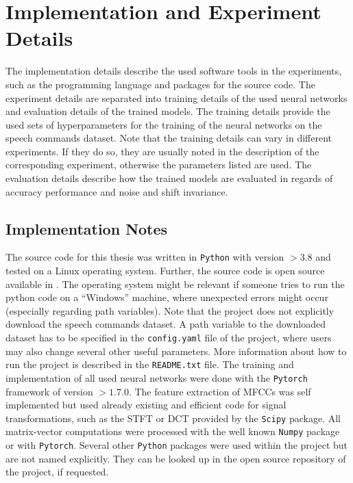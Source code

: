 
\section{Implementation and Experiment Details}\label{sec:exp_details}
The implementation details describe the used software tools in the experiments, such as the programming language and packages for the source code.
The experiment details are separated into training details of the used neural networks and evaluation details of the trained models.
The training details provide the used sets of hyperparameters for the training of the neural networks on the speech commands dataset.
Note that the training details can vary in different experiments.
If they do so, they are usually noted in the description of the corresponding experiment, otherwise the parameters listed are used.
The evaluation details describe how the trained models are evaluated in regards of accuracy performance and noise and shift invariance.



\subsection{Implementation Notes}\label{sec:exp_details_implementation}
The source code for this thesis was written in \texttt{Python} with version $>3.8$ and tested on a Linux operating system.
Further, the source code is open source available in \cite{KWSGame}.
The operating system might be relevant if someone tries to run the python code on a \enquote{Windows} machine, where unexpected errors might occur (especially regarding path variables).
Note that the project does not explicitly download the speech commands dataset.
A path variable to the downloaded dataset has to be specified in the \texttt{config.yaml} file of the project, where users may also change several other useful parameters.
More information about how to run the project is described in the \texttt{README.txt} file.
The training and implementation of all used neural networks were done with the \texttt{Pytorch} \cite{Pytorch} framework of version $>1.7.0$. 
The feature extraction of MFCCs was self implemented but used already existing and efficient code for signal transformations, such as the STFT or DCT provided by the \texttt{Scipy} package.
All matrix-vector computations were processed with the well known \texttt{Numpy} package or with \texttt{Pytorch}.
Several other \texttt{Python} packages were used within the project but are not named explicitly.
They can be looked up in the open source repository of the project, if requested.


